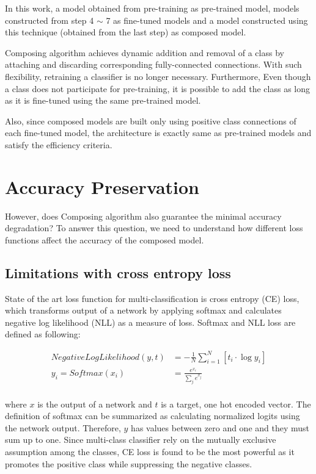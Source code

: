 \documentclass{article}
\begin{document}
In this work, a model obtained from pre-training as pre-trained model, models constructed from step 4 $\sim$ 7 as fine-tuned models and a model constructed using this technique (obtained from the last step) as composed model.

Composing algorithm achieves dynamic addition and removal of a class by attaching and discarding corresponding fully-connected connections. With such flexibility, retraining a classifier is no longer necessary. Furthermore, Even though a class does not participate for pre-training, it is possible to add the class as long as it is fine-tuned using the same pre-trained model.

Also, since composed models are built only using positive class connections of each fine-tuned model, the architecture is exactly same as pre-trained models and satisfy the efficiency criteria.

\section{Accuracy Preservation}

However, does Composing algorithm also guarantee the minimal accuracy degradation? To answer this question, we need to understand how different loss functions affect the accuracy of the composed model.

\subsection{Limitations with cross entropy loss}

State of the art loss function for multi-classification is cross entropy (CE) loss, which transforms output of a network by applying softmax and calculates negative log likelihood (NLL) as a measure of loss. Softmax and NLL loss are defined as following:

\begin{align*}
NegativeLogLikelihood(y, t) & = -\frac{1}{N}\sum_{i=1}^N \left[ t_i \cdot \log y_i\right] \\
y_i = Softmax(x_i) &= \frac{e^{x_i}}{\sum_{j}e^{x_j}} \\
\end{align*}

where $x$ is the output of a network and $t$ is a target, one hot encoded vector. The definition of softmax can be summarized as calculating normalized logits using the network output. Therefore, $y$ has values between zero and one and they must sum up to one. Since multi-class classifier rely on the mutually exclusive assumption among the classes, CE loss is found to be the most powerful as it promotes the positive class while suppressing the negative classes.
\end{document}
